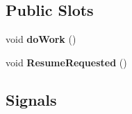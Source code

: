\subsection*{Public Slots}
\begin{DoxyCompactItemize}
\item 
\hypertarget{classWorker_a4c6b6f22801862ae967df319161af625}{}void {\bfseries do\+Work} ()\label{classWorker_a4c6b6f22801862ae967df319161af625}

\item 
\hypertarget{classWorker_a2ef295af6e23dd8878f2427e4388591f}{}void {\bfseries Resume\+Requested} ()\label{classWorker_a2ef295af6e23dd8878f2427e4388591f}

\end{DoxyCompactItemize}
\subsection*{Signals}
